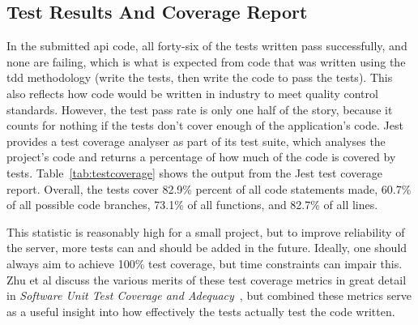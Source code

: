 \subsection{Test Results And Coverage Report}

In the submitted \acrshort{api} code, all forty-six of the tests written pass
successfully, and none are failing, which is what is expected from code that
was written using the \acrfull{tdd} methodology (write the tests, then write
the code to pass the tests). This also reflects how code would be written in
industry to meet quality control standards. However, the test pass rate is
only one half of the story, because it counts for nothing if the tests don't
cover enough of the application's code. Jest provides a test coverage
analyser as part of its test suite, which analyses the project's code and
returns a percentage of how much of the code is covered by tests.
Table~\ref{tab:testcoverage} shows the output from the Jest test coverage
report. Overall, the tests cover 82.9\% percent of all code statements made,
60.7\% of all possible code branches, 73.1\% of all functions, and 82.7\% of
all lines.

This statistic is reasonably high for a small project, but to improve
reliability of the server, more tests can and should be added in the future.
Ideally, one should always aim to achieve 100\% test coverage, but time
constraints can impair this. Zhu et al discuss the various merits of these
test coverage metrics in great detail in \textit{Software Unit Test Coverage
and Adequacy}~\cite{zhu1997software}, but combined these metrics serve as a
useful insight into how effectively the tests actually test the code written.

